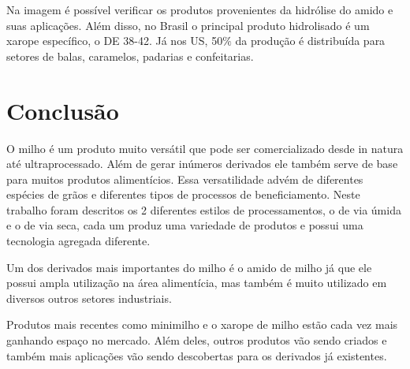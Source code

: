 \documentclass[
	12pt,				%
	openright,			%
	oneside,			%
	a4paper,			%
	english,			%
	french,				%
	spanish,			%
	brazil				%
	]{abntex2}
\begin{document}
Na imagem é possível verificar os produtos provenientes da hidrólise do amido e suas aplicações.
Além disso, no Brasil o principal produto hidrolisado é um xarope específico, o DE 38-42. Já nos US, 50$\%$ da produção é distribuída para setores de balas, caramelos, padarias e confeitarias. 


\chapter{Conclusão}

O milho é um produto muito versátil que pode ser comercializado desde in natura até ultraprocessado. Além de gerar inúmeros derivados ele também serve de base para muitos produtos alimentícios. Essa versatilidade advém de diferentes espécies de grãos e diferentes tipos de processos de beneficiamento. Neste trabalho foram descritos os 2 diferentes estilos de processamentos, o de via úmida e o de via seca, cada um produz uma variedade de produtos e possui uma tecnologia agregada diferente.

Um dos derivados mais importantes do milho é o amido de milho já que ele possui ampla utilização na área alimentícia, mas também é muito utilizado em diversos outros setores industriais. 

Produtos mais recentes como minimilho e o xarope de milho estão cada vez mais ganhando espaço no mercado. Além deles, outros produtos vão sendo criados e também mais aplicações vão sendo descobertas para os derivados já existentes.



\newpage
\postextual






\end{document}
